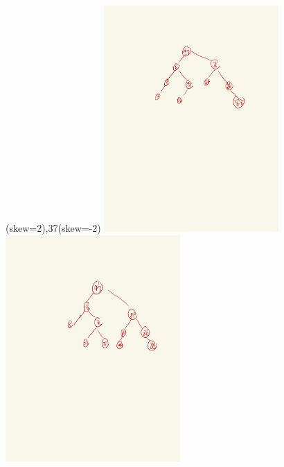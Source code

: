 \documentclass[12pt,twoside]{article}
\begin{document}


\begin{problems}

\problem  %

\begin{problemparts}
(skew=2),37(skew=-2)
\problempart %
\includegraphics[width=0.5\textwidth]{ps4-1-b.jpg}
\problempart %
\includegraphics[width=0.5\textwidth]{ps4-1-c.jpg}
\end{problemparts}


\end{problems}
\end{document}
